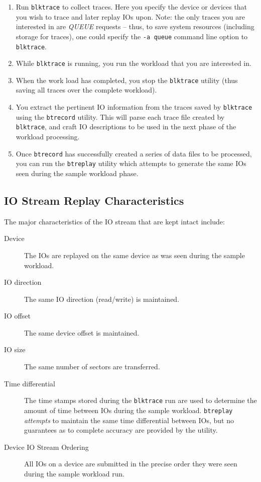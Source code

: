 \documentclass{article}
\begin{document}
\begin{enumerate}
  \item Run \texttt{blktrace} to collect traces. Here you specify the
  device or devices that you wish to trace and later replay IOs upon. Note:
  the only traces you are interested in are \emph{QUEUE} requests --
  thus, to save system resources (including storage for traces), one could
  specify the \texttt{-a queue} command line option to \texttt{blktrace}.

  \item While \texttt{blktrace} is running, you run the workload that you
  are interested in. 

  \item When the work load has completed, you stop the \texttt{blktrace}
  utility (thus saving all traces over the complete workload). 

  \item You extract the pertinent IO information from the traces saved by
  \texttt{blktrace} using the \texttt{btrecord} utility. This will parse
  each trace file created by \texttt{blktrace}, and craft IO descriptions
  to be used in the next phase of the workload processing.

  \item Once \texttt{btrecord} has successfully created a series of data
  files to be processed, you can run the \texttt{btreplay} utility which
  attempts to generate the same IOs seen during the sample workload phase.
\end{enumerate}

\subsection{IO Stream Replay Characteristics}
  The major characteristics of the IO stream that are kept intact include:

  \begin{description}
    \item[Device] The IOs are replayed on the same device as was seen
    during the sample workload.

    \item[IO direction] The same IO direction (read/write) is maintained.

    \item[IO offset] The same device offset is maintained.

    \item[IO size] The same number of sectors are transferred.

    \item[Time differential] The time stamps stored during the
    \texttt{blktrace} run are used to determine the amount of time between
    IOs during the sample workload. \texttt{btreplay} \emph{attempts} to
    maintain the same time differential between IOs, but no guarantees as
    to complete accuracy are provided by the utility.

    \item[Device IO Stream Ordering] All IOs on a device are submitted in
    the precise order they were seen during the sample workload run. 
  \end{description}
\end{document}
